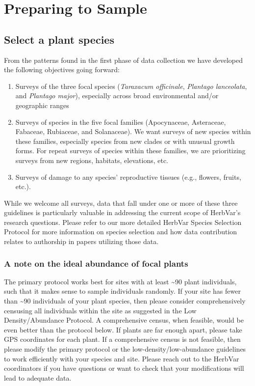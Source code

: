 \documentclass[
  letterpaper,
  oneside,
  open=any]{scrbook}
\begin{document}
\section{Preparing to Sample}\label{preparing-to-sample}

\subsection{Select a plant species}\label{select-a-plant-species}

From the patterns found in the first phase of data collection we have
developed the following objectives going forward:

\begin{enumerate}
\def\labelenumi{\arabic{enumi}.}
\item
  Surveys of the three focal species (\emph{Taraxacum officinale},
  \emph{Plantago lanceolata}, and \emph{Plantago major}), especially
  across broad environmental and/or geographic ranges
\item
  Surveys of species in the five focal families (Apocynaceae,
  Asteraceae, Fabaceae, Rubiaceae, and Solanaceae). We want surveys of
  new species within these families, especially species from new clades
  or with unusual growth forms. For repeat surveys of species within
  these families, we are prioritizing surveys from new regions,
  habitats, elevations, etc.
\item
  Surveys of damage to any species' reproductive tissues (e.g., flowers,
  fruits, etc.).
\end{enumerate}

While we welcome all surveys, data that fall under one or more of these
three guidelines is particularly valuable in addressing the current
scope of HerbVar's research questions. Please refer to our more detailed
HerbVar Species Selection Protocol for more information on species
selection and how data contribution relates to authorship in papers
utilizing those data.

\subsubsection{A note on the ideal abundance of focal
plants}\label{a-note-on-the-ideal-abundance-of-focal-plants}

The primary protocol works best for sites with at least
\textasciitilde90 plant individuals, such that it makes sense to sample
individuals randomly. If your site has fewer than \textasciitilde90
individuals of your plant species, then please consider comprehensively
censusing all individuals within the site as suggested in the Low
Density/Abundance Protocol. A comprehensive census, when feasible, would
be even better than the protocol below. If plants are far enough apart,
please take GPS coordinates for each plant. If a comprehensive census is
not feasible, then please modify the primary protocol or the
low-density/low-abundance guidelines to work efficiently with your
species and site. Please reach out to the HerbVar coordinators if you
have questions or want to check that your modifications will lead to
adequate data.
\end{document}
